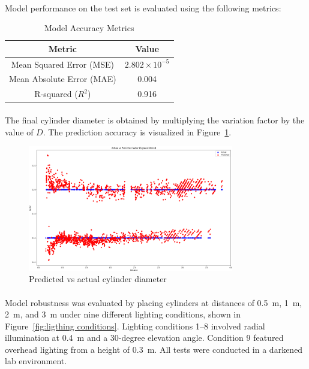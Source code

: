 \paragraph*{}
Model performance on the test set is evaluated using the following metrics:

\begin{table}[h]
\centering
\caption{Model Accuracy Metrics}
\label{tab:model_accuracy}
\begin{tabular}{|c|c|}
\hline
\textbf{Metric} & \textbf{Value} \\
\hline
Mean Squared Error (MSE) & \(2.802 \times 10^{-5}\) \\
Mean Absolute Error (MAE) & 0.004 \\
R-squared (\(R^2\)) & 0.916 \\
\hline
\end{tabular}
\end{table}

\paragraph*{}
The final cylinder diameter is obtained by multiplying the variation factor by the value of \( D \). The prediction accuracy is visualized in Figure~\ref{fig:width_result}.

\begin{figure}[H]
    \centering
    \includegraphics[width=0.8\textwidth]{assets/images/object_detection/fig5.png}
    \caption{Predicted vs actual cylinder diameter}
    \label{fig:width_result}
\end{figure}

\paragraph*{}
Model robustness was evaluated by placing cylinders at distances of 0.5~m, 1~m, 2~m, and 3~m under nine different lighting conditions, shown in Figure~\ref{fig:ligthing conditions}. Lighting conditions 1–8 involved radial illumination at 0.4~m and a 30-degree elevation angle. Condition 9 featured overhead lighting from a height of 0.3~m. All tests were conducted in a darkened lab environment.

